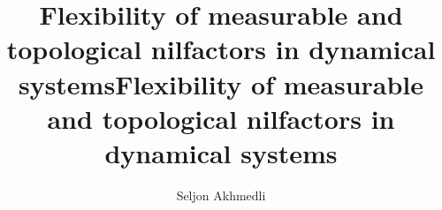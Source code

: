 \documentclass[12pt]{amsart}
\title{Flexibility of measurable and topological nilfactors in dynamical systems}
\author{Seljon Akhmedli}
\title[Flexibility of nilfactors in dynamical systems]{Flexibility of measurable and topological nilfactors in dynamical systems}
\theoremstyle{definition}
\theoremstyle{plain}
\theoremstyle{definition}
\numberwithin{equation}{section}
\begin{document}

\end{document}
